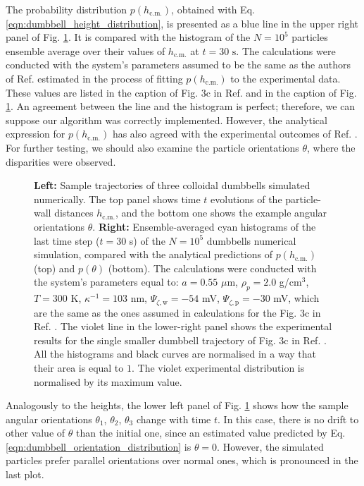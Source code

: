 \documentclass{master_thesis}
\begin{document}
The probability distribution $p(h_{\textrm{c.m.}})$, obtained with Eq. \eqref{eqn:dumbbell_height_distribution}, is presented as a blue line in the upper right panel of Fig. \ref{fig:small_dumbbells_simulation_distributions}. It is compared with the histogram of the $N=10^5$ particles ensemble average over their values of $h_{\textrm{c.m.}}$ at $t=30\textrm{ s}$. The calculations were conducted with the system's parameters assumed to be the same as the authors of Ref. \cite{verweij2021} estimated in the process of fitting $p(h_{\textrm{c.m.}})$ to the experimental data. These values are listed in the caption of Fig. 3c in Ref. \cite{verweij2021} and in the caption of Fig. \ref{fig:small_dumbbells_simulation_distributions}. An agreement between the line and the histogram is perfect; therefore, we can suppose our algorithm was correctly implemented. However, the analytical expression for $p(h_{\textrm{c.m.}})$ has also agreed with the experimental outcomes of Ref. \cite{verweij2021}. For further testing, we should also examine the particle orientations $\theta$, where the disparities were observed.

\begin{figure}
    
    \caption{\textbf{Left:} Sample trajectories of three colloidal dumbbells simulated numerically. The top panel shows time $t$ evolutions of the particle-wall distances $h_{\textrm{c.m.}}$, and the bottom one shows the example angular orientations $\theta$. \textbf{Right:} Ensemble-averaged cyan histograms of the last time step ($t = 30$ s) of the $N=10^5$ dumbbells numerical simulation, compared with the analytical predictions of $p(h_{\textrm{c.m.}})$ (top) and $p(\theta)$ (bottom). The calculations were conducted with the system's parameters equal to: $a=0.55$ $\mu$m, $\rho_p = 2.0$ g/cm$^{3}$, $T=300$ K, $\kappa^{-1} = 103$ nm, $\Psi_{\zeta,\textrm{w}}=-54$ mV, $\Psi_{\zeta,\textrm{p}}=-30$ mV, which are the same as the ones assumed in calculations for the Fig. 3c in Ref. \cite{verweij2021}. The violet line in the lower-right panel shows the experimental results for the single smaller dumbbell trajectory of Fig. 3c in Ref. \cite{verweij2021}. All the histograms and black curves are normalised in a way that their area is equal to $1$. The violet experimental distribution is normalised by its maximum value.}
\label{fig:small_dumbbells_simulation_distributions}
\end{figure}

Analogously to the heights, the lower left panel of Fig. \ref{fig:small_dumbbells_simulation_distributions} shows how the sample angular orientations $\theta_1$, $\theta_2$, $\theta_3$ change with time $t$. In this case, there is no drift to other value of $\theta$ than the initial one, since an estimated value predicted by Eq. \eqref{eqn:dumbbell_orientation_distribution} is $\theta=0$. However, the simulated particles prefer parallel orientations over normal ones, which is pronounced in the last plot.
\end{document}
